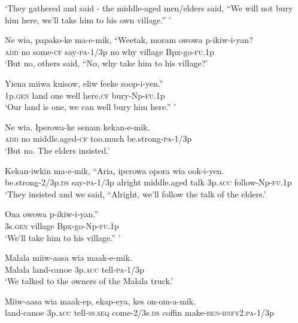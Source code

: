 \glt ‘They gathered and said - the middle-aged men/elders said, “We will not bury him here, we’ll take him to his own village.” ’ \\
\z


\ea\label{ex:a:x53}
\gll  Ne  wia,  papako-ke  ma-e-mik,  “Weetak,  moram  owowa  p-ikiw-i-yan? \\
\textsc{add}  no  some-\textsc{cf}  say-\textsc{pa}-1/3p  no  why  village  Bpx-go-\textsc{fu}.1p \\
\glt ‘But no, others said, “No, why take him to his village?’ \\
\z


\ea\label{ex:a:x54}
\gll  Yiena  miiwa  kuisow,  eliw  feeke  soop-i-yen.” \\
1p.\textsc{gen}  land  one  well  here.\textsc{cf}  bury-Np-\textsc{fu}.1p \\
\glt ‘Our land is one, we can well bury him here.” ’ \\
\z


\ea\label{ex:a:x55}
\gll  Ne  wia.  Iperowa-ke  senam  kekan-e-mik. \\
\textsc{add}  no  middle.aged-\textsc{cf}  too.much  be.strong-\textsc{pa}-1/3p \\
\glt ‘But no. The elders insisted.’ \\
\z


\ea\label{ex:a:x56}
\gll  Kekan-iwkin  ma-e-mik,  “Aria,  iperowa  opora  wia            ook-i-yen. \\
be.strong-2/3p.\textsc{ds}  say-\textsc{pa}-1/3p  alright  middle.aged  talk  3p.\textsc{acc}   follow-Np-\textsc{fu}.1p \\


\glt ‘They insisted and we said, “Alright, we’ll follow the talk of the elders.’ \\
\z


\ea\label{ex:a:x57}
\gll  Ona  owowa  p-ikiw-i-yan.” \\
3s.\textsc{gen}  village  Bpx-go-Np-\textsc{fu}.1p \\
\glt ‘We’ll take him to his village.” ’ \\
\z


\ea\label{ex:a:x58}
\gll  Malala  miiw-aasa  wia  maak-e-mik. \\
Malala  land-canoe  3p.\textsc{acc}  tell-\textsc{pa}-1/3p \\
\glt ‘We talked to the owners of the Malala truck.’ \\
\z


\ea\label{ex:a:x59}
\gll  Miiw-aasa  wia  maak-ep,  ekap-eya,  kes          on-om-a-mik. \\
land-canoe  3p.\textsc{acc}  tell-\textsc{ss.seq}  come-2/3s.\textsc{ds}  coffin   make-\textsc{ben}-\textsc{bnfy}2.\textsc{pa}-1/3p \\


